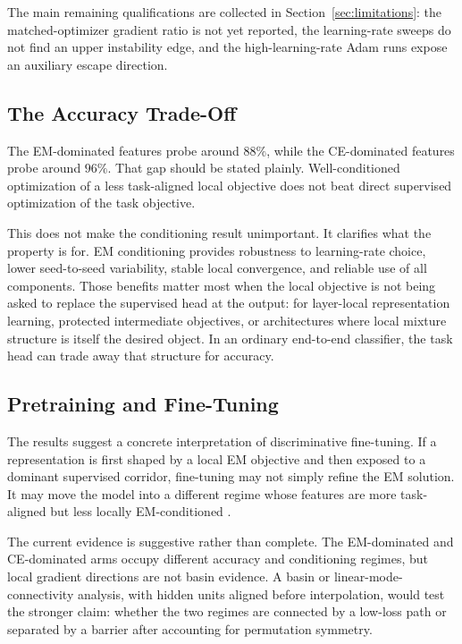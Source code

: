 The main remaining qualifications are collected in
Section~\ref{sec:limitations}: the matched-optimizer gradient ratio is not yet
reported, the learning-rate sweeps do not find an upper instability edge, and
the high-learning-rate Adam runs expose an auxiliary escape direction.

\subsection{The Accuracy Trade-Off}
The EM-dominated features probe around $88\%$, while the CE-dominated features
probe around $96\%$. That gap should be stated plainly. Well-conditioned
optimization of a less task-aligned local objective does not beat direct
supervised optimization of the task objective.

This does not make the conditioning result unimportant. It clarifies what the
property is for. EM conditioning provides robustness to learning-rate choice,
lower seed-to-seed variability, stable local convergence, and reliable use of
all components. Those benefits matter most when the local objective is not
being asked to replace the supervised head at the output: for layer-local
representation learning, protected intermediate objectives, or architectures
where local mixture structure is itself the desired object. In an ordinary
end-to-end classifier, the task head can trade away that structure for
accuracy.

\subsection{Pretraining and Fine-Tuning}
The results suggest a concrete interpretation of discriminative fine-tuning.
If a representation is first shaped by a local EM objective and then exposed
to a dominant supervised corridor, fine-tuning may not simply refine the EM
solution. It may move the model into a different regime whose features are
more task-aligned but less locally EM-conditioned \citep{kumar2022fine}.

The current evidence is suggestive rather than complete. The EM-dominated and
CE-dominated arms occupy different accuracy and conditioning regimes, but
local gradient directions are not basin evidence. A basin or
linear-mode-connectivity analysis, with hidden units aligned before
interpolation, would test the stronger claim: whether the two regimes are
connected by a low-loss path or separated by a barrier after accounting for
permutation symmetry.

